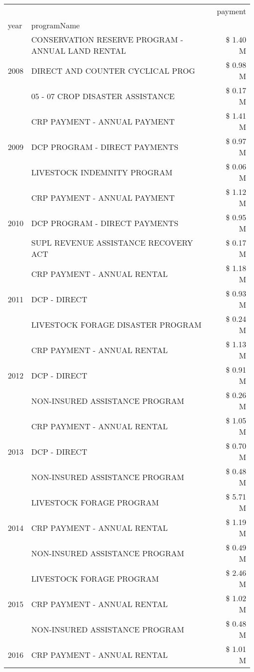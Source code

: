 \begin{tabular}{llr}
\toprule
 &  & payment \\
year & programName &  \\
\midrule
\multirow[t]{3}{*}{2008} & CONSERVATION RESERVE PROGRAM - ANNUAL LAND RENTAL & \$ 1.40 M \\
 & DIRECT AND COUNTER CYCLICAL PROG & \$ 0.98 M \\
 & 05 - 07 CROP DISASTER ASSISTANCE & \$ 0.17 M \\
\cline{1-3}
\multirow[t]{3}{*}{2009} & CRP PAYMENT - ANNUAL PAYMENT & \$ 1.41 M \\
 & DCP PROGRAM - DIRECT PAYMENTS & \$ 0.97 M \\
 & LIVESTOCK INDEMNITY PROGRAM & \$ 0.06 M \\
\cline{1-3}
\multirow[t]{3}{*}{2010} & CRP PAYMENT - ANNUAL PAYMENT & \$ 1.12 M \\
 & DCP PROGRAM - DIRECT PAYMENTS & \$ 0.95 M \\
 & SUPL REVENUE ASSISTANCE RECOVERY ACT & \$ 0.17 M \\
\cline{1-3}
\multirow[t]{3}{*}{2011} & CRP PAYMENT - ANNUAL RENTAL & \$ 1.18 M \\
 & DCP - DIRECT & \$ 0.93 M \\
 & LIVESTOCK FORAGE DISASTER PROGRAM & \$ 0.24 M \\
\cline{1-3}
\multirow[t]{3}{*}{2012} & CRP PAYMENT - ANNUAL RENTAL & \$ 1.13 M \\
 & DCP - DIRECT & \$ 0.91 M \\
 & NON-INSURED ASSISTANCE PROGRAM & \$ 0.26 M \\
\cline{1-3}
\multirow[t]{3}{*}{2013} & CRP PAYMENT - ANNUAL RENTAL & \$ 1.05 M \\
 & DCP - DIRECT & \$ 0.70 M \\
 & NON-INSURED ASSISTANCE PROGRAM & \$ 0.48 M \\
\cline{1-3}
\multirow[t]{3}{*}{2014} & LIVESTOCK FORAGE PROGRAM & \$ 5.71 M \\
 & CRP PAYMENT - ANNUAL RENTAL & \$ 1.19 M \\
 & NON-INSURED ASSISTANCE PROGRAM & \$ 0.49 M \\
\cline{1-3}
\multirow[t]{3}{*}{2015} & LIVESTOCK FORAGE PROGRAM & \$ 2.46 M \\
 & CRP PAYMENT - ANNUAL RENTAL & \$ 1.02 M \\
 & NON-INSURED ASSISTANCE PROGRAM & \$ 0.48 M \\
\cline{1-3}
\multirow[t]{3}{*}{2016} & CRP PAYMENT - ANNUAL RENTAL & \$ 1.01 M \\

\end{tabular}
